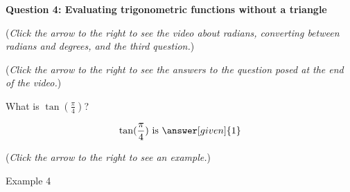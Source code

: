 \documentclass{ximera}
\begin{document}
\textbf{Question 4: Evaluating trigonometric functions
without a triangle}
\begin{question}
\begin{flushright}
{\color{blue}(\emph{Click the arrow to the right to see the video about radians, converting between radians and degrees, and the third question.})}
\end{flushright}
\begin{center}
\begin{expandable}
{\color{blue}(\emph{Click the arrow to the right to see the answers 
to the question posed at the end of the video.})}
\begin{expandable}
What is $\tan(\frac{\pi}{4})$?
\begin{prompt}
\[
\tan(\frac{\pi}{4})\text{ is }\answer[given]{1}
\]
\end{prompt}
\begin{flushright}
{\color{blue}(\emph{Click the arrow to the right to see an example.})}
\end{flushright}
\begin{expandable}
Example 4
\end{expandable}
\end{expandable}
\end{expandable}
\end{center}
\end{question}
\end{document}

